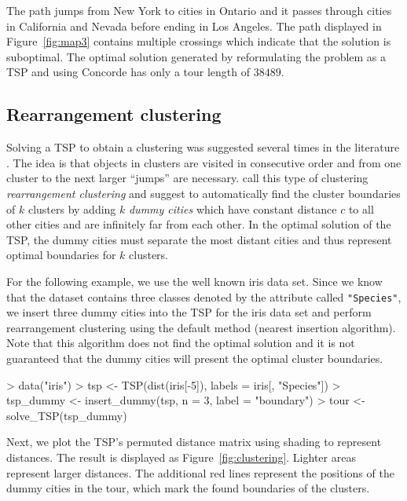 \documentclass[10pt,a4paper,fleqn]{article}
\newcommand{\code}[1]{\mbox{\texttt{#1}}}
\begin{document}
The path jumps from New York to cities in Ontario and it passes through cities
in California and Nevada before ending in Los Angeles. The path displayed
in Figure~\ref{fig:map3} contains multiple crossings which indicate that
the solution is suboptimal. The optimal solution generated by reformulating
the problem as a TSP and using Concorde has only a tour length of $38489$.

\subsection{Rearrangement clustering}
Solving a TSP to obtain a clustering was suggested several times in the
literature \citep[see, e.g.,][]{Lenstra1974, Alpert1997, Johnson2004}.  The idea
is that objects in clusters are visited in consecutive order and from one
cluster to the next larger ``jumps'' are necessary.  \cite{Climer2006} call
this type of clustering \emph{rearrangement clustering} and suggest to
automatically find the cluster boundaries of $k$ clusters by adding $k$
\emph{dummy cities} which have constant distance $c$ to all other cities and
are infinitely far from each other. In the optimal
solution of the TSP, the dummy cities must separate the most distant cities and
thus represent optimal boundaries for $k$ clusters.

For the following example, we use the well known iris data set. Since we know
that the dataset contains three classes denoted by the attribute called
\code{"Species"}, we insert three dummy cities into the TSP for the iris data
set and perform rearrangement clustering using the default method (nearest
insertion algorithm).  Note that this algorithm does not find the optimal
solution and it is not guaranteed that the dummy cities will present the
optimal cluster boundaries.

\begin{Schunk}
\begin{Sinput}
> data("iris")
> tsp <- TSP(dist(iris[-5]), labels = iris[, "Species"])
> tsp_dummy <- insert_dummy(tsp, n = 3, label = "boundary")
> tour <- solve_TSP(tsp_dummy)
\end{Sinput}
\end{Schunk}

Next, we plot the TSP's permuted distance matrix using shading to
represent distances. The result is displayed as
Figure~\ref{fig:clustering}. Lighter areas represent larger
distances. The additional red lines represent the positions of the dummy
cities in the tour, which mark the found boundaries of the clusters.
\end{document}
